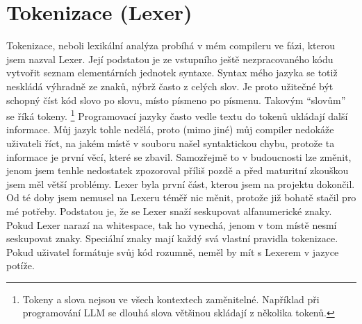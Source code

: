 \documentclass[12pt, a4paper, titlepage, abstract=on]{scrreprt}
\begin{document}
\section{Tokenizace (Lexer)}
Tokenizace, neboli lexikální analýza probíhá v mém compileru ve fázi, kterou jsem nazval Lexer. Její podstatou je ze vstupního ještě
nezpracovaného kódu vytvořit seznam elementárních jednotek syntaxe. Syntax mého jazyka se totiž neskládá výhradně ze znaků, nýbrž často
z celých slov. Je proto užitečné být schopný číst kód slovo po slovu, místo písmeno po písmenu. Takovým \enquote{slovům} se říká tokeny.
\footnote{Tokeny a slova nejsou ve všech kontextech zaměnitelné. Například při programování LLM se dlouhá slova většinou skládají z několika tokenů.}
Programovací jazyky často vedle textu do tokenů ukládají další informace. Můj jazyk tohle nedělá, proto (mimo jiné) můj compiler nedokáže
uživateli říct, na jakém místě v souboru našel syntaktickou chybu, protože ta informace je první věcí, které se zbavil. Samozřejmě
to v budoucnosti lze změnit, jenom jsem tenhle nedostatek zpozoroval příliš pozdě a před maturitní zkouškou jsem měl větší problémy.
Lexer byla první část, kterou jsem na projektu dokončil. Od té doby jsem nemusel na Lexeru téměř nic měnit, protože již bohatě stačil
pro mé potřeby. Podstatou je, že se Lexer snaží seskupovat alfanumerické znaky. Pokud Lexer narazí na whitespace, tak ho vynechá, jenom
v tom místě nesmí seskupovat znaky. Speciální znaky mají každý svá vlastní pravidla tokenizace. Pokud uživatel formátuje svůj kód rozumně,
neměl by mít s Lexerem v jazyce potíže.
\end{document}
